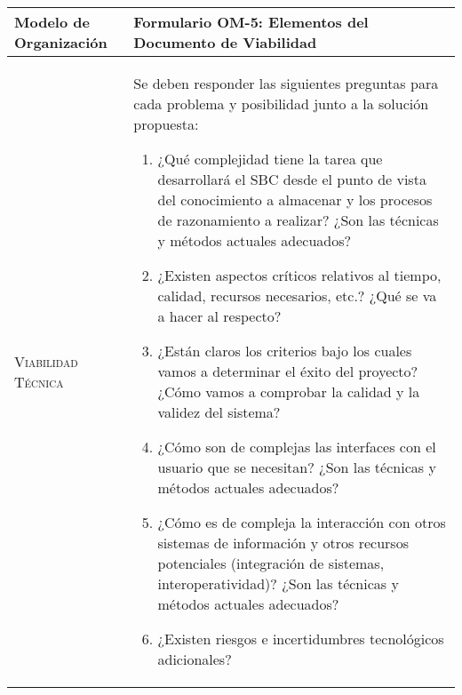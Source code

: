 \documentclass[12pt,a4paper,twoside,spanish]{article}      %
\begin{document}
\begin{table}[H]
\scriptsize
\begin{tabularx}{\textwidth}{|l|X|} \hline

\textbf{Modelo de Organización} & \textbf{Formulario OM-5: Elementos del Documento de Viabilidad}\\ \hline\hline

\textsc{Viabilidad Técnica} & Se deben responder las siguientes preguntas para cada problema y posibilidad junto
a la solución propuesta:
\begin{enumerate}
    \item ¿Qué complejidad tiene la tarea que desarrollará el SBC desde el punto de vista del
conocimiento a almacenar y los procesos de razonamiento a realizar?
¿Son las técnicas y métodos actuales adecuados?
    \item ¿Existen aspectos críticos relativos al tiempo, calidad, recursos necesarios, etc.?
¿Qué se va a hacer al respecto?
    \item ¿Están claros los criterios bajo los cuales vamos a determinar el éxito del
proyecto? ¿Cómo vamos a comprobar la calidad y la validez del sistema?
    \item ¿Cómo son de complejas las interfaces con el usuario que se necesitan? ¿Son las técnicas y métodos actuales adecuados?
    \item ¿Cómo es de compleja la interacción con otros sistemas de información y otros
recursos potenciales (integración de sistemas, interoperatividad)? ¿Son las técnicas y métodos actuales adecuados?
    \item ¿Existen riesgos e incertidumbres tecnológicos adicionales?
\end{enumerate}   \\ \hline



\end{tabularx}
\end{table}
\end{document}
